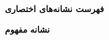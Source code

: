 {
    \centering
    \textbf{فهرست نشانه‌های اختصاری}
    \par
}

\vspace{\baselineskip}
\textbf{نشانه} \hfill \textbf{مفهوم}

\vspace{0.5\baselineskip}
